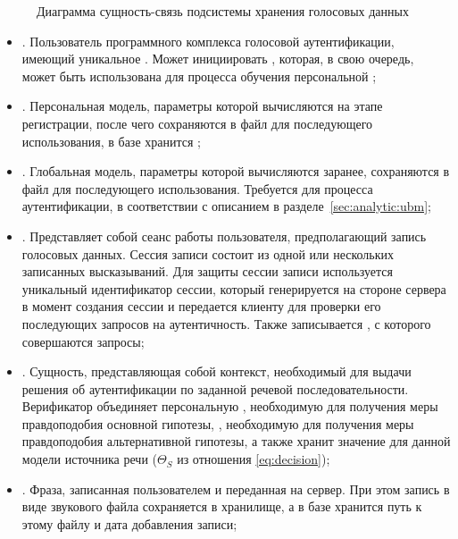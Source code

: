 \begin{figure}[ht]
    \caption{Диаграмма сущность-связь подсистемы хранения голосовых данных}
    \label{fig:er_main}
\end{figure}

\begin{itemize}
\item {}. Пользователь программного комплекса голосовой аутентификации, имеющий уникальное . Может инициировать , которая, в свою очередь, может быть использована для процесса обучения персональной ;
\item {}. Персональная модель, параметры которой вычисляются на этапе регистрации, после чего сохраняются в файл для последующего использования, в базе хранится ;
\item {}. Глобальная модель, параметры которой вычисляются заранее, сохраняются в файл для последующего использования. Требуется для процесса аутентификации, в соответствии с описанием в разделе~\ref{sec:analytic:ubm};
\item {}. Представляет собой сеанс работы пользователя, предполагающий запись голосовых данных. Сессия записи состоит из одной или нескольких записанных высказываний. Для защиты сессии записи используется уникальный идентификатор сессии, который генерируется на стороне сервера в момент создания сессии и передается клиенту для проверки его последующих запросов на аутентичность. Также записывается , с которого совершаются запросы;
\item {}. Сущность, представляющая собой контекст, необходимый для выдачи решения об аутентификации по заданной речевой последовательности. Верификатор объединяет персональную , необходимую для получения меры правдоподобия основной гипотезы, , необходимую для получения меры правдоподобия альтернативной гипотезы, а также хранит значение  для данной модели источника речи ($\Theta_S$ из отношения \ref{eq:decision});
\item {}. Фраза, записанная пользователем и переданная на сервер. При этом запись в виде звукового файла сохраняется в хранилище, а в базе хранится путь к этому файлу и дата добавления записи;

\end{itemize}
